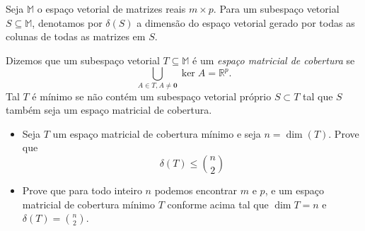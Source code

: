 Seja \(\mathbb{M}\) o espaço vetorial de matrizes reais \(m \times p\). Para um subespaço vetorial \(S\subseteq \mathbb{M}\), denotamos por \(\delta(S)\) a dimensão do espaço vetorial gerado por todas as colunas de todas as matrizes em \(S\).

Dizemos que um subespaço vetorial \(T\subseteq \mathbb{M}\) é um \emph{espaço matricial de cobertura} se
\[ \bigcup_{A\in T, A\ne \mathbf{0}} \ker A =\mathbb{R}^p. \]
Tal \(T\) é mínimo se não contém um subespaço vetorial próprio \(S\subset T\) tal que \(S\) também seja um espaço matricial de cobertura.
\begin{itemize}
  \item[(a)] Seja \(T\) um espaço matricial de cobertura mínimo e seja \(n=\dim (T)\). Prove que \[ \delta(T)\le \binom{n}{2} \]
  \item[(b)] Prove que para todo inteiro \(n\) podemos encontrar \(m\) e \(p\), e um espaço matricial de cobertura mínimo \(T\) conforme acima tal que \(\dim T=n\) e \(\delta(T)=\binom{n}{2}\).
\end{itemize}
